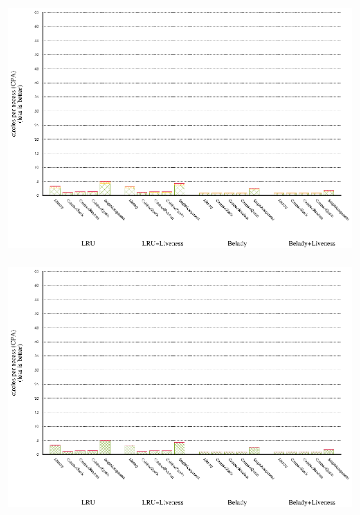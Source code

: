 \documentclass[onecolumn, openright, master, english, signatures]{dbrgrptt}
\begin{document}
\begin{figure}[!ht]
  \begin{subfigure}[b]{0.5\textwidth}%
    \includegraphics[width=\textwidth]{figs/plots/perf-462-libquantum.eps}
  \end{subfigure}%
  \begin{subfigure}[b]{0.5\textwidth}%
    \includegraphics[width=\textwidth]{figs/plots/perf-misses-462-libquantum.eps}
  \end{subfigure}%
  \caption{}
  \label{fig:todo}
\end{figure}
\end{document}
